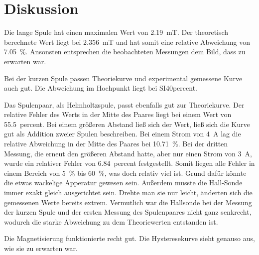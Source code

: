 \section{Diskussion}
\label{sec:Diskussion}

Die lange Spule hat einen maximalen Wert von \SI{2.19}{\milli\tesla}. Der theoretisch berechnete Wert liegt bei \SI{2.356}{\milli\tesla} und hat somit eine relative Abweichung von \SI{7.05}{\percent}. Ansonsten entsprechen die beobachteten Messungen dem Bild, dass zu erwarten war. 

Bei der kurzen Spule passen Theoriekurve und experimental gemessene Kurve auch gut. Die Abweichung im Hochpunkt liegt bei SI{40}{percent}. 

Das Spulenpaar, als Helmholtzspule, passt ebenfalls gut zur Theoriekurve. Der relative Fehler des Werts in der Mitte des Paares liegt bei einem Wert von \SI{55.5}{percent}.
Bei einem größeren Abstand ließ sich der Wert, ließ sich die Kurve gut als Addition zweier Spulen beschreiben. Bei einem Strom von \SI{4}{\ampere} lag die relative Abweichung in der Mitte des Paares bei \SI{10.71}{\percent}. 
Bei der dritten Messung, die erneut den größeren Abstand hatte, aber nur einen Strom von \SI{3}{\ampere}, wurde ein relativer Fehler von \SI{6.84}{percent} festgestellt. Somit liegen alle Fehler in einem Bereich von \SI{5}{\percent} bis \SI{60}{\percent}, was doch relativ viel ist. Grund dafür könnte die etwas wackelige Apperatur gewesen sein. Außerdem musste die Hall-Sonde immer exakt gleich ausgerichtet sein. Drehte man sie nur leicht, änderten sich die gemessenen Werte bereits extrem. Vermutlich war die Hallsonde bei der Messung der kurzen Spule und der ersten Messung des Spulenpaares nicht ganz senkrecht, wodurch die starke Abweichung zu dem Theoriewerten entstanden ist. 

Die Magnetisierung funktionierte recht gut. Die Hysteresekurve sieht genauso aus, wie sie zu erwarten war. 
